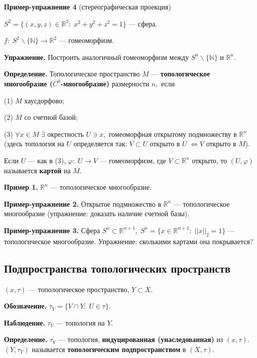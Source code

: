 \documentclass[12pt,a4paper]{article}
\begin{document}
\textbf{Пример-упражнение 4} (стереографическая проекция)

$S^{2} = \{(x, y, z) \in \mathbb{R}^{3}: \; x^{2} + y^{2} + z^{2} = 1\}$ --- сфера. 

$f: \; S^{2} \backslash \{\mathbb{N}\} \to \mathbb{R}^{2}$ --- гомеоморфизм. 

\textbf{Упражнение.} Построить аналогичный гомеоморфизм между $S^{n} \backslash \{\mathbb{N}\}$ и $\mathbb{R}^{n}.$ 

\textbf{Определение.} Топологическое пространство $M$ --- \textbf{топологическое многообразие ($C^{0}$-многообразие)} размерности $n,$ если 

(1) $M$ хаусдорфово; 

(2) $M$ со счетной базой; 

(3) $\forall x \in M \; \exists$ окрестность $U \ni x,$ гомеоморфная открытому подмножеству в $\mathbb{R}^{n}$ (здесь топология на $U$ определяется так: $V \subset U$ открыто в $U \; \Leftrightarrow V$ открыто в $M$). 

Если $U$ --- как в (3), $\varphi: \; U \to V$ --- гомеоморфизм, где $V \subset \mathbb{R}^{n}$ открыто, то $(U, \varphi)$ называется \textbf{картой} на $M.$ 

\textbf{Пример 1.} $\mathbb{R}^{n}$ --- топологическое многообразие. 

\textbf{Пример-упражнение 2.} Открытое подмножество в $\mathbb{R}^{n}$ --- топологическое многообразие (упражнение: доказать наличие счетной базы). 

\textbf{Пример-упражнение 3.} Сфера $S^{n} \subset \mathbb{R}^{n + 1}, \; S^{n} = \{x \in \mathbb{R}^{n + 1}: \; ||x||_{2} = 1\}$ --- топологическое многообразие. Упражнение: сколькими картами она покрывается? 

\subsection{Подпространства топологических пространств} 

$(x, \tau)$ --- топологическое пространство, $Y \subset X.$ 

\textbf{Обозначение.} $\tau_{Y} = \{V \cap Y: \; U \in \tau\}.$ 

\textbf{Наблюдение.} $\tau_{Y}$ --- топология на $Y.$ 

\textbf{Определение.} $\tau_{Y}$ --- топология, \textbf{индуцированная (унаследованная)} из $(x, \tau).$ $(Y, \tau_{Y})$ называется \textbf{топологическим подпространством} в $(X, \tau).$
\end{document}
